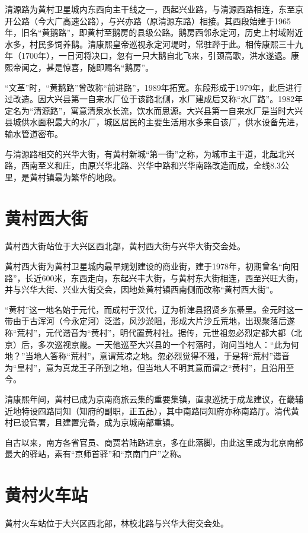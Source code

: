 清源路为黄村卫星城内东西向主干线之一，西起兴业路，与清源西路相连，东至京开公路（今大广高速公路），与兴亦路（原清源东路）相接。其西段始建于1965年，旧名“黄鹅路”，即黄村至鹅房的县级公路。鹅房西邻永定河，历史上村域附近水多，村民多饲养鹅。清康熙皇帝巡视永定河堤时，常驻跸于此。相传康熙三十九年（1700年），一日河将决口，忽有一只大鹅自北飞来，引颈高歌，洪水遂退。康熙帝闻之，甚是惊喜，随即赐名“鹅房”。

“文革”时，“黄鹅路”曾改称“前进路”，1989年拓宽。东段形成于1979年，此后进行过改造。因大兴县第一自来水厂位于该路北侧，水厂建成后又称“水厂路”。1982年定名为“清源路”，寓意清泉水长流，饮水而思源。大兴县第一自来水厂是当时大兴县城供水面积最大的水厂，城区居民的主要生活用水多来自该厂，供水设备先进，输水管道密布。

与清源路相交的兴华大街，有黄村新城“第一街”之称，为城市主干道，北起北兴路，西南至义和庄，由原兴华北路、兴华中路和兴华南路改造而成，全线8.3公里，是黄村镇最为繁华的地段。

\section{黄村西大街}
黄村西大街站位于大兴区西北部，黄村西大街与兴华大街交会处。

黄村西大街为黄村卫星城内最早规划建设的商业街，建于1978年，初期曾名“向阳路”，长近600米，东西走向，东起兴丰大街，与黄村东大街相连，西至兴旺大街，并与兴华大街、兴业大街交会，因地处黄村镇西南侧而改称“黄村西大街”。

“黄村”这一地名始于元代，而成村于汉代，辽为析津县招贤乡东綦里。金元时这一带由于古浑河（今永定河）泛滥，风沙淤阻，形成大片沙丘荒地，出现聚落后遂称“荒村”，元代谐音为“黄村”，明代置黄村社。据传，元世祖忽必烈定都大都（北京）后，多次巡视京畿。一天他巡至大兴县的一个村落时，询问当地人：“此为何地？”当地人答称“荒村”，意谓荒凉之地。忽必烈觉得不雅，于是将“荒村”谐音为“皇村”，意为真龙王子所到之地，但当地人不明其意而谓之“黄村”，且沿用至今。

清康熙年间，黄村已成为京南商旅云集的重要集镇，直隶巡抚于成龙建议，在畿辅近地特设四路同知（知府的副职，正五品），其中南路同知府亦称南路厅。清代黄村已设官署，且建置完备，成为京城南部重镇。

自古以来，南方各省官员、商贾若陆路进京，多在此落脚，由此这里成为北京南部最大的驿站，素有“京师首驿”和“京南门户”之称。

\section{黄村火车站}
黄村火车站位于大兴区西北部，林校北路与兴华大街交会处。

